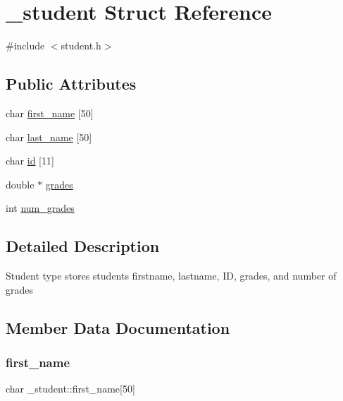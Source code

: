 \hypertarget{struct__student}{}\section{\+\_\+student Struct Reference}
\label{struct__student}


{\ttfamily \#include $<$student.\+h$>$}

\subsection*{Public Attributes}
\begin{DoxyCompactItemize}
\item 
char \mbox{\hyperlink{struct__student_a272ec3136434e8d3281a615cf31cc987}{first\+\_\+name}} \mbox{[}50\mbox{]}
\item 
char \mbox{\hyperlink{struct__student_a18eb2a90671a2292c017b8f4fbde7eec}{last\+\_\+name}} \mbox{[}50\mbox{]}
\item 
char \mbox{\hyperlink{struct__student_adaee78078859cdecdbe9128dd655b748}{id}} \mbox{[}11\mbox{]}
\item 
double $\ast$ \mbox{\hyperlink{struct__student_ad0f75a9ff0f6104eb9e3bb3c4f7ad97b}{grades}}
\item 
int \mbox{\hyperlink{struct__student_a6592ee968ed2226737f45243e7602636}{num\+\_\+grades}}
\end{DoxyCompactItemize}


\subsection{Detailed Description}
Student type stores student\textquotesingle{}s firstname, lastname, ID, grades, and number of grades 

\subsection{Member Data Documentation}
\mbox{\label{struct__student_a272ec3136434e8d3281a615cf31cc987}} 
\subsubsection{\texorpdfstring{first\+\_\+name}{first\_name}}
{\footnotesize\ttfamily char \+\_\+student\+::first\+\_\+name\mbox{[}50\mbox{]}}

